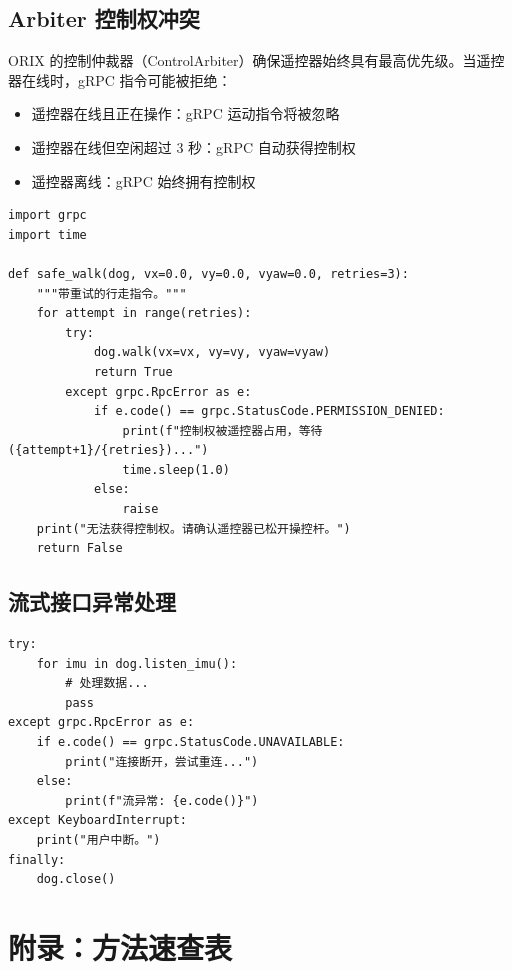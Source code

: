 \documentclass[a4paper,11pt,openany]{book}
\begin{document}
\subsection{Arbiter 控制权冲突}

ORIX 的控制仲裁器（ControlArbiter）确保遥控器始终具有最高优先级。当遥控器在线时，gRPC 指令可能被拒绝：

\begin{itemize}[nosep]
  \item 遥控器在线且正在操作：gRPC 运动指令将被忽略
  \item 遥控器在线但空闲超过 3 秒：gRPC 自动获得控制权
  \item 遥控器离线：gRPC 始终拥有控制权
\end{itemize}

\begin{lstlisting}[style=python]
import grpc
import time

def safe_walk(dog, vx=0.0, vy=0.0, vyaw=0.0, retries=3):
    """带重试的行走指令。"""
    for attempt in range(retries):
        try:
            dog.walk(vx=vx, vy=vy, vyaw=vyaw)
            return True
        except grpc.RpcError as e:
            if e.code() == grpc.StatusCode.PERMISSION_DENIED:
                print(f"控制权被遥控器占用，等待 ({attempt+1}/{retries})...")
                time.sleep(1.0)
            else:
                raise
    print("无法获得控制权。请确认遥控器已松开操控杆。")
    return False
\end{lstlisting}

\subsection{流式接口异常处理}

\begin{lstlisting}[style=python]
try:
    for imu in dog.listen_imu():
        # 处理数据...
        pass
except grpc.RpcError as e:
    if e.code() == grpc.StatusCode.UNAVAILABLE:
        print("连接断开，尝试重连...")
    else:
        print(f"流异常: {e.code()}")
except KeyboardInterrupt:
    print("用户中断。")
finally:
    dog.close()
\end{lstlisting}

\section*{附录：方法速查表}
\end{document}
